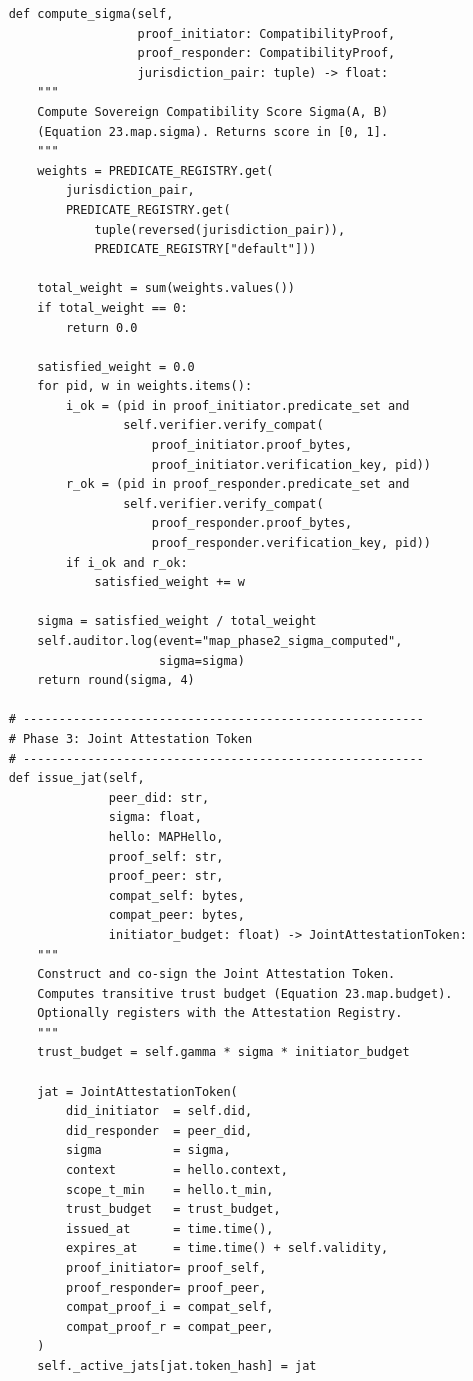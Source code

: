 \begin{lstlisting}
    def compute_sigma(self,
                      proof_initiator: CompatibilityProof,
                      proof_responder: CompatibilityProof,
                      jurisdiction_pair: tuple) -> float:
        """
        Compute Sovereign Compatibility Score Sigma(A, B)
        (Equation 23.map.sigma). Returns score in [0, 1].
        """
        weights = PREDICATE_REGISTRY.get(
            jurisdiction_pair,
            PREDICATE_REGISTRY.get(
                tuple(reversed(jurisdiction_pair)),
                PREDICATE_REGISTRY["default"]))

        total_weight = sum(weights.values())
        if total_weight == 0:
            return 0.0

        satisfied_weight = 0.0
        for pid, w in weights.items():
            i_ok = (pid in proof_initiator.predicate_set and
                    self.verifier.verify_compat(
                        proof_initiator.proof_bytes,
                        proof_initiator.verification_key, pid))
            r_ok = (pid in proof_responder.predicate_set and
                    self.verifier.verify_compat(
                        proof_responder.proof_bytes,
                        proof_responder.verification_key, pid))
            if i_ok and r_ok:
                satisfied_weight += w

        sigma = satisfied_weight / total_weight
        self.auditor.log(event="map_phase2_sigma_computed",
                         sigma=sigma)
        return round(sigma, 4)

    # --------------------------------------------------------
    # Phase 3: Joint Attestation Token
    # --------------------------------------------------------
    def issue_jat(self,
                  peer_did: str,
                  sigma: float,
                  hello: MAPHello,
                  proof_self: str,
                  proof_peer: str,
                  compat_self: bytes,
                  compat_peer: bytes,
                  initiator_budget: float) -> JointAttestationToken:
        """
        Construct and co-sign the Joint Attestation Token.
        Computes transitive trust budget (Equation 23.map.budget).
        Optionally registers with the Attestation Registry.
        """
        trust_budget = self.gamma * sigma * initiator_budget

        jat = JointAttestationToken(
            did_initiator  = self.did,
            did_responder  = peer_did,
            sigma          = sigma,
            context        = hello.context,
            scope_t_min    = hello.t_min,
            trust_budget   = trust_budget,
            issued_at      = time.time(),
            expires_at     = time.time() + self.validity,
            proof_initiator= proof_self,
            proof_responder= proof_peer,
            compat_proof_i = compat_self,
            compat_proof_r = compat_peer,
        )
        self._active_jats[jat.token_hash] = jat


\end{lstlisting}
